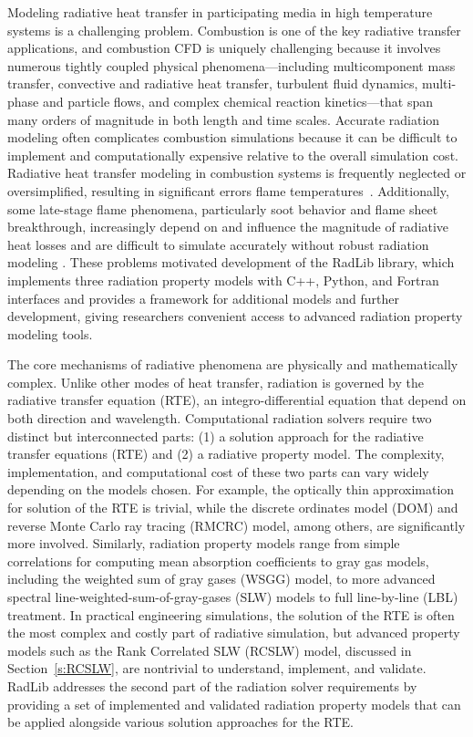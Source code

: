 \documentclass[preprint,12pt]{elsarticle}
\begin{document}
Modeling radiative heat transfer in participating media in high temperature systems is a challenging problem. Combustion is one of the key radiative transfer applications, and combustion CFD is uniquely challenging because it involves numerous tightly coupled physical phenomena---including multicomponent mass transfer, convective and radiative heat transfer, turbulent fluid dynamics, multi-phase and particle flows, and complex chemical reaction kinetics---that span many orders of magnitude in both length and time scales.
Accurate radiation modeling often complicates combustion simulations because it can be difficult to implement and computationally expensive relative to the overall simulation cost.
Radiative heat transfer modeling in combustion systems is frequently neglected or oversimplified, resulting in significant errors flame temperatures~\citep{Modest_2016}.
Additionally, some late-stage flame phenomena, particularly soot behavior and flame sheet breakthrough, increasingly depend on and influence the magnitude of radiative heat losses and are difficult to simulate accurately without robust radiation modeling \cite{Modest_2013}. These problems motivated development of the RadLib library, which implements three radiation property models with C++, Python, and Fortran interfaces and provides a framework for additional models and further development, giving researchers convenient access to advanced radiation property modeling tools.

The core mechanisms of radiative phenomena are physically and mathematically complex.
Unlike other modes of heat transfer, radiation is governed by the radiative transfer equation (RTE), an integro-differential equation that depend on both direction and wavelength.
Computational radiation solvers require two distinct but interconnected parts: (1) a solution approach for the radiative transfer equations (RTE) and (2) a radiative property model. The complexity, implementation, and computational cost of these two parts can vary widely depending on the models chosen.
For example, the optically thin approximation for solution of the RTE is trivial, while the discrete ordinates model (DOM) and reverse Monte Carlo ray tracing (RMCRC) model, among others, are significantly more involved.
Similarly, radiation property models range from simple correlations for computing mean absorption coefficients to gray gas models, including the weighted sum of gray gases (WSGG) model, to more advanced spectral line-weighted-sum-of-gray-gases (SLW) models to full line-by-line (LBL) treatment.
In practical engineering simulations, the solution of the RTE is often the most complex and costly part of radiative simulation, but advanced property models such as the Rank Correlated SLW (RCSLW) model, discussed in Section~\ref{s:RCSLW}, are nontrivial to understand, implement, and validate.
RadLib addresses the second part of the radiation solver requirements by providing a set of implemented and validated radiation property models that can be applied alongside various solution approaches for the RTE.
\end{document}
